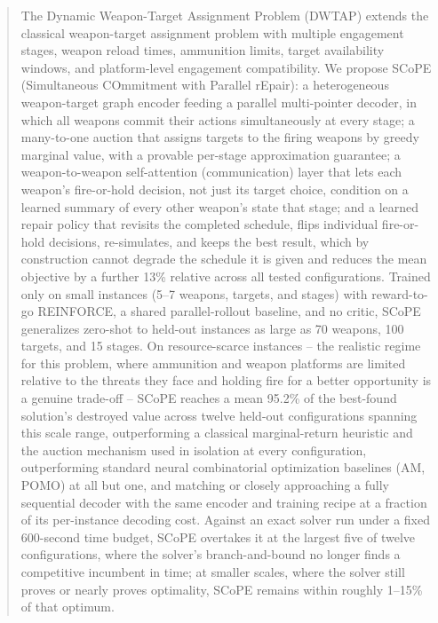 \begin{abstract}
The Dynamic Weapon-Target Assignment Problem (DWTAP) extends the classical
weapon-target assignment problem with multiple engagement stages, weapon
reload times, ammunition limits, target availability windows, and
platform-level engagement compatibility. We propose SCoPE (Simultaneous
COmmitment with Parallel rEpair): a heterogeneous
weapon-target graph encoder feeding a parallel multi-pointer decoder, in
which all weapons commit their actions simultaneously at every stage; a
many-to-one auction that assigns targets to the firing weapons by greedy
marginal value, with a provable per-stage approximation guarantee;
a weapon-to-weapon self-attention (communication) layer that lets each
weapon's fire-or-hold decision, not just its target choice, condition on a
learned summary of every other weapon's state that stage; and a learned
repair policy that revisits the completed schedule, flips individual
fire-or-hold decisions, re-simulates, and keeps the best result, which by
construction cannot degrade the schedule it is given and reduces the mean
objective by a further 13\% relative across all tested configurations. Trained only on
small instances (5--7 weapons, targets, and stages) with reward-to-go
REINFORCE, a shared parallel-rollout baseline, and no critic, SCoPE
generalizes zero-shot to held-out instances as large as 70 weapons, 100
targets, and 15 stages. On resource-scarce instances -- the realistic
regime for this problem, where ammunition and weapon platforms are limited
relative to the threats they face and holding fire for a better opportunity
is a genuine trade-off -- SCoPE reaches a mean 95.2\% of the best-found
solution's destroyed value across twelve held-out configurations spanning
this scale range, outperforming a classical marginal-return heuristic and
the auction mechanism used in isolation at every configuration,
outperforming standard neural combinatorial optimization baselines (AM,
POMO) at all but one, and matching or closely approaching a fully
sequential decoder with the same encoder and training recipe at a fraction
of its per-instance decoding cost. Against an exact solver run under a
fixed 600-second time budget, SCoPE overtakes it at the largest five of
twelve configurations, where the solver's branch-and-bound no longer finds
a competitive incumbent in time; at smaller scales, where the solver still
proves or nearly proves optimality, SCoPE remains within roughly 1--15\% of
that optimum.

\end{abstract}

